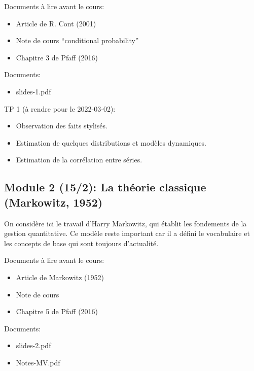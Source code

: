 \documentclass[
  11pt,
]{article}
\providecommand{\tightlist}{%
  \setlength{\itemsep}{0pt}\setlength{\parskip}{0pt}}
\begin{document}
Documents à lire avant le cours:

\begin{itemize}
\tightlist
\item
  Article de R. Cont (2001)
\item
  Note de cours ``conditional probability''
\item
  Chapitre 3 de Pfaff (2016)
\end{itemize}

Documents:

\begin{itemize}
\tightlist
\item
  slides-1.pdf
\end{itemize}

TP 1 (à rendre pour le 2022-03-02):

\begin{itemize}
\tightlist
\item
  Observation des faits stylisés.
\item
  Estimation de quelques distributions et modèles dynamiques.
\item
  Estimation de la corrélation entre séries.
\end{itemize}

\hypertarget{module-2-152-la-thuxe9orie-classique-markowitz1952}{%
\subsection{Module 2 (15/2): La théorie classique (Markowitz,
1952)}\label{module-2-152-la-thuxe9orie-classique-markowitz1952}}

On considère ici le travail d'Harry Markowitz, qui établit les
fondements de la gestion quantitative. Ce modèle reste important car il
a défini le vocabulaire et les concepts de base qui sont toujours
d'actualité.

Documents à lire avant le cours:

\begin{itemize}
\tightlist
\item
  Article de Markowitz (1952)
\item
  Note de cours
\item
  Chapitre 5 de Pfaff (2016)
\end{itemize}

Documents:

\begin{itemize}
\tightlist
\item
  slides-2.pdf
\item
  Notes-MV.pdf
\end{itemize}
\end{document}
